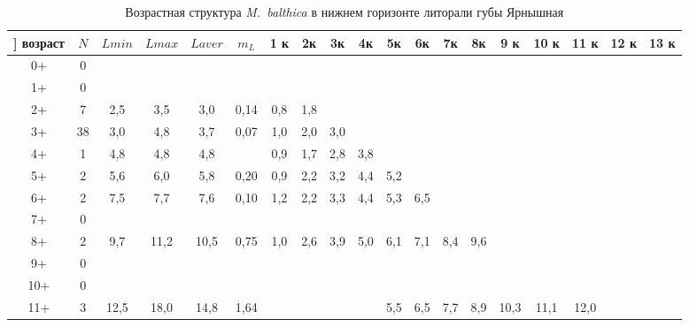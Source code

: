 \begin{landscape}
\begin{table}[h]
\caption{Возрастная структура {\it M.~balthica} в нижнем горизонте литорали губы Ярнышная}
\label{tab:Yarnyshnaya_ngl_growth_matrix}
\begin{tabular}{|c|c|cc|cc|ccccccccccccc|}
\hline]
возраст & $N$  & $L min$ & $L max$ & $L aver$ & $m_L$   & 1 к  & 2к   & 3к  & 4к   & 5к   & 6к   & 7к   & 8к   & 9 к  & 10 к & 11 к & 12 к & 13 к \\ \hline
0+      & 0  &       &       &         &         &      &      &     &      &      &      &      &      &      &      &      &      &      \\
1+      & 0  &       &       &         &         &      &      &     &      &      &      &      &      &      &      &      &      &      \\
2+      & 7  & 2,5   & 3,5   & 3,0     & 0,14    & 0,8  & 1,8  &     &      &      &      &      &      &      &      &      &      &      \\
3+      & 38 & 3,0   & 4,8   & 3,7     & 0,07    & 1,0  & 2,0  & 3,0 &      &      &      &      &      &      &      &      &      &      \\
4+      & 1  & 4,8   & 4,8   & 4,8     &         & 0,9  & 1,7  & 2,8 & 3,8  &      &      &      &      &      &      &      &      &      \\
5+      & 2  & 5,6   & 6,0   & 5,8     & 0,20    & 0,9  & 2,2  & 3,2 & 4,4  & 5,2  &      &      &      &      &      &      &      &      \\
6+      & 2  & 7,5   & 7,7   & 7,6     & 0,10    & 1,2  & 2,2  & 3,3 & 4,4  & 5,3  & 6,5  &      &      &      &      &      &      &      \\
7+      & 0  &       &       &         &         &      &      &     &      &      &      &      &      &      &      &      &      &      \\
8+      & 2  & 9,7   & 11,2  & 10,5    & 0,75    & 1,0  & 2,6  & 3,9 & 5,0  & 6,1  & 7,1  & 8,4  & 9,6  &      &      &      &      &      \\
9+      & 0  &       &       &         &         &      &      &     &      &      &      &      &      &      &      &      &      &      \\
10+     & 0  &       &       &         &         &      &      &     &      &      &      &      &      &      &      &      &      &      \\
11+     & 3  & 12,5  & 18,0  & 14,8    & 1,64    &      &      &     &      & 5,5  & 6,5  & 7,7  & 8,9  & 10,3 & 11,1 & 12,0 &      &      \\

\end{tabular}
\end{table}
\end{landscape}
